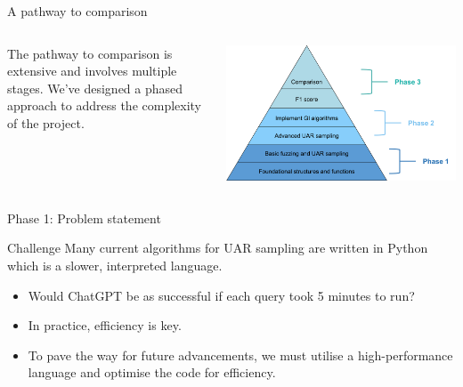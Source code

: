 \documentclass{beamer}
\begin{document}
	\begin{frame}{A pathway to comparison}
		\begin{columns}
			\begin{column}{0.3\textwidth}
				The pathway to comparison is extensive and involves multiple stages. We've designed a phased approach to address the complexity of the project. 
			\end{column}
			\begin{column}{0.7\textwidth}
				\centering
				\includegraphics[width=0.95\textheight]{img/pyramid.png}
			\end{column}
		\end{columns}
	\end{frame}

	\begin{frame}{Phase 1: Problem statement}
		\begin{alertblock}{Challenge}
			Many current algorithms for UAR sampling are written in Python which is a slower, interpreted language.
		\end{alertblock}
		\begin{itemize}
			\item Would ChatGPT be as successful if each query took 5 minutes to run?
			\item In practice, efficiency is key.
			\item To pave the way for future advancements, we must utilise a high-performance language and optimise the code for efficiency.
		\end{itemize}

	\end{frame}
\end{document}
